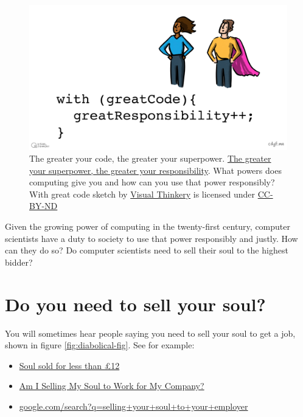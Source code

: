 \documentclass[
]{book}
\providecommand{\tightlist}{%
  \setlength{\itemsep}{0pt}\setlength{\parskip}{0pt}}
\begin{document}
\begin{figure}

{\centering \includegraphics[width=1\linewidth]{images/With great code} 

}

\caption{The greater your code, the greater your superpower. \href{https://en.wikipedia.org/wiki/With_great_power_comes_great_responsibility}{The greater your superpower, the greater your responsibility}. What powers does computing give you and how can you use that power responsibly? \citep{Shapiro2021} With great code sketch by \href{https://visualthinkery.com/}{Visual Thinkery} is licensed under \href{https://creativecommons.org/licenses/by-nd/4.0/}{CC-BY-ND}}\label{fig:spiderman-fig}
\end{figure}



Given the growing power of computing in the twenty-first century, computer scientists have a duty to society to use that power responsibly and justly. How can they do so? Do computer scientists need to sell their soul to the highest bidder?

\hypertarget{soul}{%
\section{Do you need to sell your soul?}\label{soul}}

You will sometimes hear people saying you need to sell your soul to get a job, shown in figure \ref{fig:diabolical-fig}. See for example:

\begin{itemize}
\tightlist
\item
  \href{http://news.bbc.co.uk/1/hi/england/2051061.stm}{Soul sold for less than £12} \citep{bbcsoul}
\item
  \href{https://www.thevectorimpact.com/selling-your-soul/}{Am I Selling My Soul to Work for My Company?} \citep{sellmysoul}
\item
  \href{https://www.google.com/search?q=selling+your+soul+to+your+employer}{google.com/search?q=selling+your+soul+to+your+employer}
\end{itemize}
\end{document}
